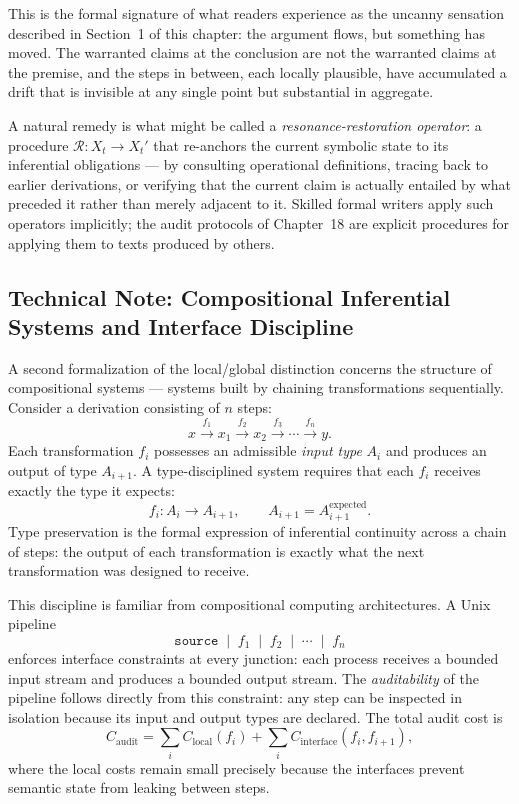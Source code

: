 \documentclass[12pt, openright, twoside]{book}
\begin{document}
\begin{technicalnote}[title={Technical Note: Inferential Stability and Symbolic Drift}]
This is the formal signature of what readers experience as the uncanny sensation
described in Section~1 of this chapter: the argument flows, but something has
moved. The warranted claims at the conclusion are not the warranted claims at
the premise, and the steps in between, each locally plausible, have accumulated
a drift that is invisible at any single point but substantial in aggregate.

A natural remedy is what might be called a \emph{resonance-restoration operator}:
a procedure $\mathcal{R} : X_t \to X_t'$ that re-anchors the current symbolic state
to its inferential obligations --- by consulting operational definitions, tracing
back to earlier derivations, or verifying that the current claim is actually entailed
by what preceded it rather than merely adjacent to it. Skilled formal writers apply
such operators implicitly; the audit protocols of Chapter~18 are explicit procedures
for applying them to texts produced by others.

\subsection*{Technical Note: Compositional Inferential Systems and Interface Discipline}

A second formalization of the local/global distinction concerns the structure of
compositional systems --- systems built by chaining transformations sequentially.
Consider a derivation consisting of $n$ steps:
\[
x \xrightarrow{f_1} x_1 \xrightarrow{f_2} x_2 \xrightarrow{f_3} \cdots
   \xrightarrow{f_n} y.
\]
Each transformation $f_i$ possesses an admissible \emph{input type} $A_i$ and
produces an output of type $A_{i+1}$. A type-disciplined system requires that each
$f_i$ receives exactly the type it expects:
\[
f_i : A_i \to A_{i+1}, \qquad A_{i+1} = A_{i+1}^{\mathrm{expected}}.
\]
Type preservation is the formal expression of inferential continuity across a chain
of steps: the output of each transformation is exactly what the next transformation
was designed to receive.

This discipline is familiar from compositional computing architectures. A Unix
pipeline
\[
\texttt{source} \;\mid\; f_1 \;\mid\; f_2 \;\mid\; \cdots \;\mid\; f_n
\]
enforces interface constraints at every junction: each process receives a bounded
input stream and produces a bounded output stream. The \emph{auditability} of the
pipeline follows directly from this constraint: any step can be inspected in isolation
because its input and output types are declared. The total audit cost is
\[
C_{\mathrm{audit}} = \sum_i C_{\mathrm{local}}(f_i) + \sum_i C_{\mathrm{interface}}(f_i, f_{i+1}),
\]
where the local costs remain small precisely because the interfaces prevent semantic
state from leaking between steps.


\end{technicalnote}
\end{document}
